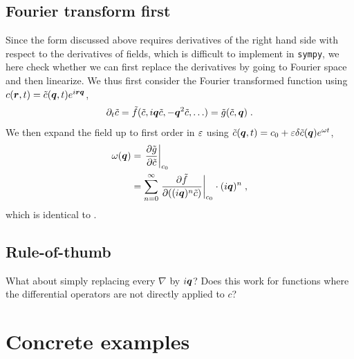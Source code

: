 \documentclass[
	superscriptaddress,
	twocolumn,
	aps, pre
]{revtex4-1}
\renewcommand{\vr}{\vect r}
\newcommand{\vq}{\vect q}
\newcommand{\dtc}{\delta \tilde c}
\begin{document}
\subsection{Fourier transform first}
Since the form discussed above requires derivatives of the right hand side with respect to the derivatives of fields, which is difficult to implement in \texttt{sympy}, we here check whether we can first replace the derivatives by going to Fourier space and then linearize.
We thus first consider the Fourier transformed function using $c(\vr, t) = \tilde c(\vq, t) e^{i\vr\vq}$,
\begin{align}
	\partial_t \tilde c = \tilde f(\tilde c, i\vq \tilde c, -\vq^2 \tilde c, \ldots) = \tilde g(\tilde c, \vect q)
	\;.
\end{align}
We then expand the field up to first order in $\varepsilon$ using $\tilde c(\vq, t) = c_0 + \eps \dtc(\vq)e^{\omega t}$,
\begin{align}
	\label{eqn:growth_rate_hypothesis}
	\omega(\vq) &= \takenat{\pfrac{\tilde g}{\tilde c}}{c_0} 
\notag\\
	&= \sum_{n=0}^\infty \takenat{\pfrac{\tilde f}{((i\vq)^n\tilde c)}}{c_0} \cdot (i\vq)^n
	\;,
\end{align}
which is identical to .

\subsection{Rule-of-thumb}
What about simply replacing every $\nabla$ by $i\vq$?
Does this work for functions where the differential operators are not directly applied to $c$?


\section{Concrete examples}
\end{document}
